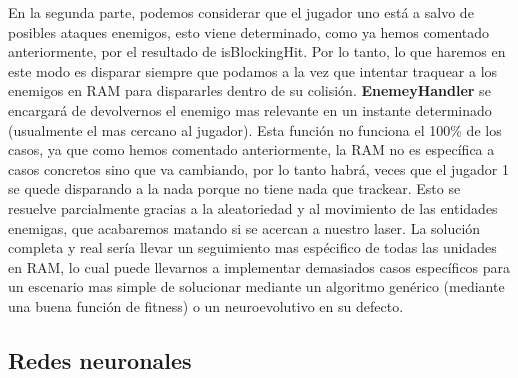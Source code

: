 En la segunda parte, podemos considerar que el jugador uno está a salvo de posibles ataques enemigos, esto viene determinado, como ya hemos comentado anteriormente, por el resultado de isBlockingHit. Por lo tanto, lo que haremos en este modo es disparar siempre que podamos a la vez que intentar traquear a los enemigos en RAM para dispararles dentro de su colisión. \textbf{EnemeyHandler} se encargará de devolvernos el enemigo mas relevante en un instante determinado (usualmente el mas cercano al jugador). Esta función no funciona el 100\% de los casos, ya que como hemos comentado anteriormente, la RAM no es específica a casos concretos sino que va cambiando, por lo tanto habrá, veces que el jugador 1 se quede disparando a la nada porque no tiene nada que trackear. Esto se resuelve parcialmente gracias a la aleatoriedad y al movimiento de las entidades enemigas, que acabaremos matando si se acercan a nuestro laser. La solución completa y real sería llevar un seguimiento mas espécifico de todas las unidades en RAM, lo cual puede llevarnos a implementar demasiados casos específicos para un escenario mas simple de solucionar mediante un algoritmo genérico (mediante una buena función de fitness) o un neuroevolutivo en su defecto.


\newpage
\subsection{Redes neuronales}
\label{subsec:nn}


\newpage